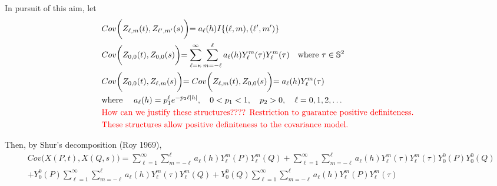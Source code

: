 \documentclass[11pt]{article}
\begin{document}
\begin{itemize}
In pursuit of this aim, let\\
\begin{align*}
&Cov\biggl( Z_{\ell,m}(t), Z_{\ell',m'}(s) \biggl) = a_{\ell}(h) I\{(\ell,m),(\ell',m')\} \\
&Cov\biggl( Z_{0,0}(t), Z_{0,0}(s) \biggl) = \sum_{\ell=\kappa}^{\infty} \sum_{m=-\ell}^{\ell} a_{\ell}(h) Y_{\ell}^{m}(\tau) Y_{\ell}^{m}(\tau)  \quad \text{where } \tau \in \mathbb{S}^2 \\
&Cov\biggl( Z_{0,0}(t), Z_{\ell,m}(s) \biggl) =Cov\biggl( Z_{\ell,m}(t), Z_{0,0}(s) \biggl) = a_{\ell}(h) Y_{\ell}^{m}(\tau)\\
&\text{where } \quad a_\ell(h)=p_1^\ell e^{-p_2 \ell |h|}, \quad 0<p_1<1, \quad p_2>0, \quad \ell=0,1,2,\dots\\
&\text{\color{red} How can we justify these structures???? Restriction to guarantee positive definiteness.}\\
&\text{\color{red} These structures allow positive definiteness to the covariance model.}\\
\end{align*}


Then, by Shur's decomposition (Roy 1969),\\
\begin{align*}
&Cov\biggl(X(P,t), X(Q,s)\biggl) = \sum_{\ell=1}^{\infty} \sum_{m=-\ell}^{\ell}  a_{\ell}(h) Y_{\ell}^{m}(P) Y_{\ell}^{m}(Q) + \sum_{\ell=1}^{\infty} \sum_{m=-\ell}^{\ell} a_\ell(h) Y_{\ell}^{m}(\tau) Y_{\ell}^{m}(\tau) Y_{0}^{0}(P) Y_{0}^{0}(Q)\\
&+ Y_{0}^{0}(P) \sum_{\ell=1}^{\infty} \sum_{m=-\ell}^{\ell}  a_{\ell}(h) Y_{\ell}^{m}(\tau) Y_{\ell}^{m}(Q) + Y_{0}^{0}(Q) \sum_{\ell=1}^{\infty} \sum_{m=-\ell}^{\ell}  a_{\ell}(h) Y_{\ell}^{m}(P) Y_{\ell}^{m}(\tau)\\
\end{align*}


\end{itemize}
\end{document}
